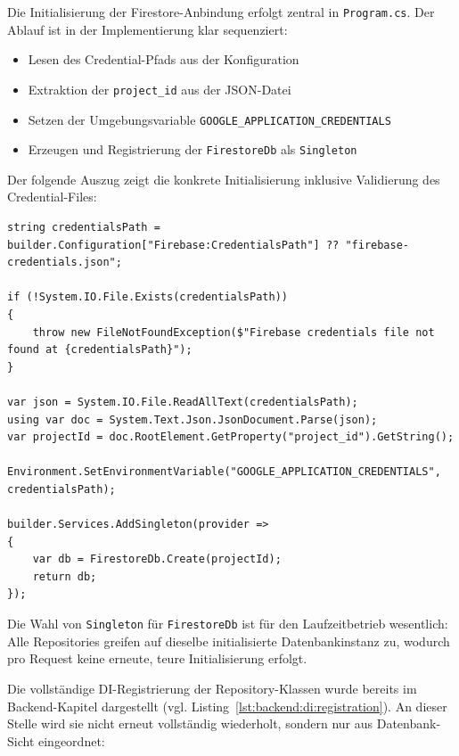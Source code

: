 Die Initialisierung der Firestore-Anbindung erfolgt zentral in \texttt{Program.cs}. Der Ablauf ist in der Implementierung klar sequenziert:

\begin{itemize}
    \item Lesen des Credential-Pfads aus der Konfiguration
    \item Extraktion der \texttt{project\_id} aus der JSON-Datei
    \item Setzen der Umgebungsvariable \texttt{GOOGLE\_APPLICATION\_CREDENTIALS}
    \item Erzeugen und Registrierung der \texttt{FirestoreDb} als \texttt{Singleton}
\end{itemize}

Der folgende Auszug zeigt die konkrete Initialisierung inklusive Validierung des Credential-Files:

\begin{lstlisting}[language={[Sharp]C},caption={Firestore-Initialisierung in Program.cs},label={lst:db:di:firestore-init},basicstyle=\ttfamily\small,breaklines=true,breakatwhitespace=false,columns=fullflexible]
string credentialsPath = builder.Configuration["Firebase:CredentialsPath"] ?? "firebase-credentials.json";

if (!System.IO.File.Exists(credentialsPath))
{
    throw new FileNotFoundException($"Firebase credentials file not found at {credentialsPath}");
}

var json = System.IO.File.ReadAllText(credentialsPath);
using var doc = System.Text.Json.JsonDocument.Parse(json);
var projectId = doc.RootElement.GetProperty("project_id").GetString();

Environment.SetEnvironmentVariable("GOOGLE_APPLICATION_CREDENTIALS", credentialsPath);

builder.Services.AddSingleton(provider =>
{
    var db = FirestoreDb.Create(projectId);
    return db;
});
\end{lstlisting}

Die Wahl von \texttt{Singleton} für \texttt{FirestoreDb} ist für den Laufzeitbetrieb wesentlich: Alle Repositories greifen auf dieselbe initialisierte Datenbankinstanz zu, wodurch pro Request keine erneute, teure Initialisierung erfolgt.

Die vollständige DI-Registrierung der Repository-Klassen wurde bereits im Backend-Kapitel dargestellt (vgl. Listing~\ref{lst:backend:di:registration}). An dieser Stelle wird sie nicht erneut vollständig wiederholt, sondern nur aus Datenbank-Sicht eingeordnet:

